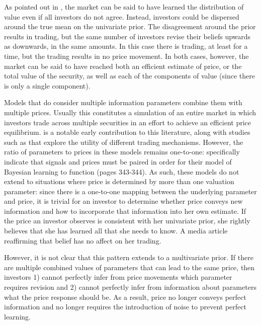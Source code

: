 \documentclass[11pt]{article}
\begin{document}
As pointed out in \citet{verrecchiaConsensusBeliefsInformation1980}, the market can be said to have learned the distribution of value even if all investors do not agree. Instead, investors could be dispersed around the true mean on the univariate prior. The disagreement around the prior results in trading, but the same number of investors revise their beliefs upwards as downwards, in the same amounts. In this case there is trading, at least for a time, but the trading results in no price movement. In both cases, however, the market can be said to have reached both an efficient estimate of price, or the total value of the security, as well as each of the components of value (since there is only a single component). 

Models that do consider multiple information parameters combine them with multiple prices. Usually this constitutes a simulation of an entire market in which investors trade across multiple securities in an effort to achieve an efficient price equilibrium.  \citet{blumeLearningBeRational1982} is a notable early contribution to this literature, along with studies such as \citet{axtellComplexityExchange2005} that explore the utility of different trading mechanisms. However, the ratio of parameters to prices in these models remains one-to-one: \citet{blumeLearningBeRational1982} specifically indicate that signals and prices must be paired in order for their model of Bayesian learning to function (pages 343-344). As such, these models do not extend to situations where price is determined by more than one valuation parameter: since there is a one-to-one mapping between the underlying parameter and price, it is trivial for an investor to determine whether price conveys new information and how to incorporate that information into her own estimate. If the price an investor observes is consistent with her univariate prior, she rightly believes that she has learned all that she needs to know. A media article reaffirming that belief has no affect on her trading. 

However, it is not clear that this pattern extends to a multivariate prior. If there are multiple combined values of parameters that can lead to the same price, then investors 1) cannot perfectly infer from price movements which parameter requires revision and 2) cannot perfectly infer from information about parameters what the price response should be. As a result, price no longer conveys perfect information and no longer requires the introduction of noise to prevent perfect learning.
\end{document}
